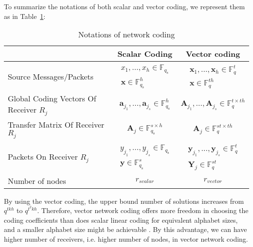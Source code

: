 To summarize the notations of both scalar and vector coding, we represent
them as in Table~\ref{tab:notations}:
\begin{table}[H]
\caption{Notations of network coding}

\label{tab:notations} 
\centering{}%
\begin{tabular}{|>{\centering}p{0.2\paperwidth}|c|c|}
\hline 
 & Scalar Coding & Vector coding\tabularnewline
\hline 
\hline 
Source Messages/Packets & $\begin{array}{c}
x_{1},\ldots,x_{h}\in\ensuremath{\mathbb{F}}_{q_{\mathrm{s}}}\\
\boldsymbol{x}\in\ensuremath{\mathbb{F}}_{q_{\mathrm{s}}}^{h}
\end{array}$ & $\begin{array}{c}
\boldsymbol{x}_{1},\ldots,\boldsymbol{x}_{h}\in\ensuremath{\mathbb{F}}_{q}^{t}\\
\boldsymbol{x}\in\ensuremath{\mathbb{F}}_{q}^{th}
\end{array}$\tabularnewline
\hline 
Global Coding Vectors Of Receiver $R_{j}$ & $\boldsymbol{a}_{j_{1}},\ldots,\boldsymbol{a}_{j_{s}}\in\ensuremath{\mathbb{F}}_{q_{\mathrm{s}}}^{h}$ & $\boldsymbol{A}_{j_{1}},\ldots,\boldsymbol{A}_{j_{s}}\in\ensuremath{\mathbb{F}}_{q}^{t\times th}$\tabularnewline
\hline 
Transfer Matrix Of Receiver $R_{j}$ & $\boldsymbol{A}_{j}\in\ensuremath{\mathbb{F}}_{q_{\mathrm{s}}}^{s\times h}$ & $\boldsymbol{A}_{j}\in\ensuremath{\mathbb{F}}_{q}^{st\times th}$\tabularnewline
\hline 
Packets On Receiver $R_{j}$ & $\begin{array}{c}
y_{j_{1}},\ldots,y_{j_{s}}\in\ensuremath{\mathbb{F}}_{q_{\mathrm{s}}}\\
\boldsymbol{y}\in\ensuremath{\mathbb{F}}_{q_{\mathrm{s}}}^{s}
\end{array}$ & $\begin{array}{c}
\boldsymbol{y}_{j_{1}},\ldots,\boldsymbol{y}_{j_{s}}\in\ensuremath{\mathbb{F}}_{q}^{t}\\
\boldsymbol{Y}_{j}\in\ensuremath{\mathbb{F}}_{q}^{st}
\end{array}$\tabularnewline
\hline 
Number of nodes & $r_{scalar}$ & $r_{vector}$\tabularnewline
\hline 
\end{tabular}
\end{table}

\begin{rem}
By using the vector coding, the upper bound number of solutions increases
from $q^{tkh}$ to $q^{t^{2}kh}$. Therefore, vector network coding
offers more freedom in choosing the coding coefficients than does
scalar linear coding for equivalent alphabet sizes, and a smaller
alphabet size might be achievable \cite{Ebrahimi:2011}. By this advantage,
we can have higher number of receivers, i.e. higher number of nodes,
in vector network coding.
\end{rem}

